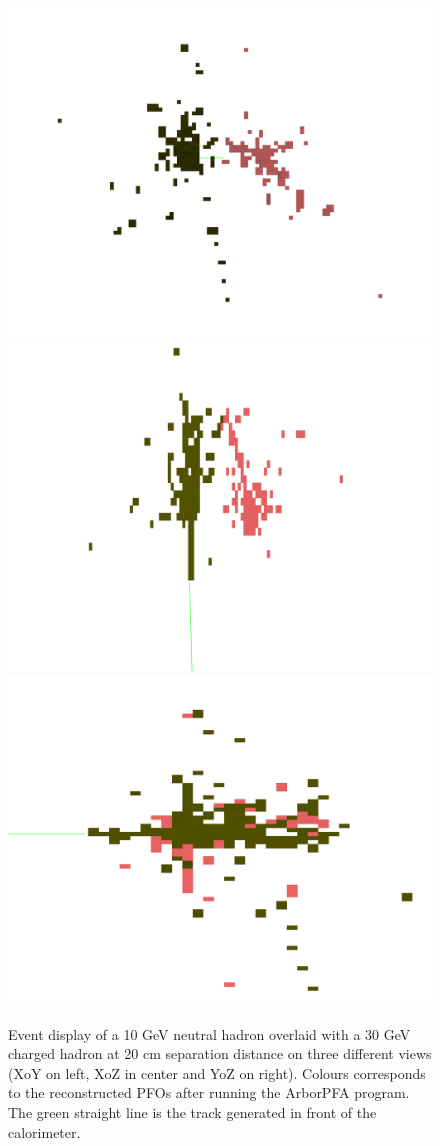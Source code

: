 \documentclass[cits]{JINST}
\begin{document}
\begin{figure}[!h]
  \begin{center}
    \includegraphics[width=0.32\linewidth]{ArborPFA_PandoraMonitoring_SDHCAL_Overlay_XY.pdf}
    \includegraphics[width=0.32\linewidth]{ArborPFA_PandoraMonitoring_SDHCAL_Overlay_XZ.pdf}
    \includegraphics[width=0.32\linewidth]{ArborPFA_PandoraMonitoring_SDHCAL_Overlay_YZ.pdf}
  \end{center}
  \caption{\label{OVERLAY_EVENT_DISPLAY} Event display of a 10 GeV neutral hadron overlaid with a 30 GeV charged hadron at 20 cm separation distance on three different views (XoY on left, XoZ in center and YoZ on right). Colours corresponds to the reconstructed PFOs after running the ArborPFA program. The green straight line is the track generated in front of the calorimeter.}
\end{figure}
\end{document}
